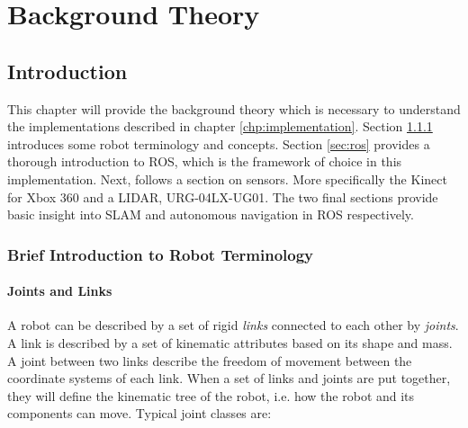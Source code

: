 \chapter{Background Theory}
\label{chp:theory} 

\section{Introduction}

This chapter will provide the background theory which is necessary to understand the implementations described in chapter \ref{chp:implementation}. Section \ref{sec:terminology} introduces some robot terminology and concepts. Section \ref{sec:ros} provides a thorough introduction to \ac{ROS}, which is the framework of choice in this implementation. Next, follows a section on sensors. More specifically the Kinect for Xbox 360 and a \ac{LIDAR}, URG-04LX-UG01. The two final sections provide basic insight into \ac{SLAM} and autonomous navigation in \ac{ROS} respectively. 

\subsection{Brief Introduction to Robot Terminology}
\label{sec:terminology}

\subsubsection{Joints and Links}

A robot can be described by a set of rigid \textit{links} connected to each other by \textit{joints}. A link is described by a set of kinematic attributes based on its shape and mass. A joint between two links describe the freedom of movement between the coordinate systems of each link. When a set of links and joints are put together, they will define the kinematic tree of the robot, i.e. how the robot and its components can move. Typical joint classes are:


